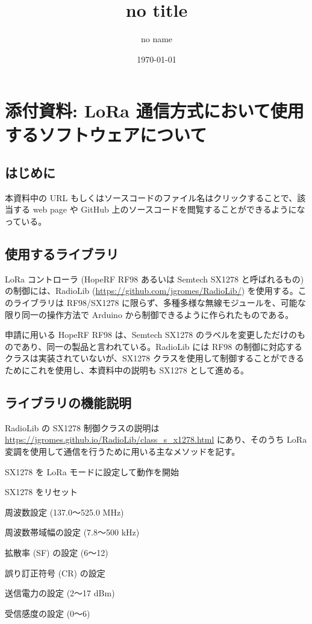 \documentclass[a4j,oneside]{ujbook}
\begin{document}
\title{no title}
\author{no name}
\date{\today}


\chapter*{添付資料: LoRa 通信方式において使用するソフトウェアについて}

\section*{はじめに}

本資料中の URL もしくはソースコードのファイル名はクリックすることで、該当する web page や GitHub 上のソースコードを閲覧することができるようになっている。

\section*{使用するライブラリ}

LoRa コントローラ (HopeRF RF98 あるいは Semtech SX1278 と呼ばれるもの) の制御には、RadioLib (\url{https://github.com/jgromes/RadioLib/}) を使用する。このライブラリは RF98/SX1278 に限らず、多種多様な無線モジュールを、可能な限り同一の操作方法で Arduino から制御できるように作られたものである。

申請に用いる HopeRF RF98 は、Semtech SX1278 のラベルを変更しただけのものであり、同一の製品と言われている。RadioLib には RF98 の制御に対応するクラスは実装されていないが、SX1278 クラスを使用して制御することができるためにこれを使用し、本資料中の説明も SX1278 として進める。

\section*{ライブラリの機能説明}

RadioLib の SX1278 制御クラスの説明は \url{https://jgromes.github.io/RadioLib/class_s_x1278.html} にあり、そのうち LoRa 変調を使用して通信を行うために用いる主なメソッドを記す。

\begin{description}[style=sameline]
 \item[begin()] SX1278 を LoRa モードに設定して動作を開始
 \item[reset()] SX1278 をリセット
 \item[setFrequency()] 周波数設定 (137.0〜525.0 MHz)
 \item[setBandwidth()] 周波数帯域幅の設定 (7.8〜500 kHz)
 \item[setSpreadingFactor()] 拡散率 (SF) の設定 (6〜12)
 \item[setCodingRate()] 誤り訂正符号 (CR) の設定
 \item[setOutputPower()] 送信電力の設定 (2〜17 dBm)
 \item[setGain()] 受信感度の設定 (0〜6)
\end{description}
\end{document}

